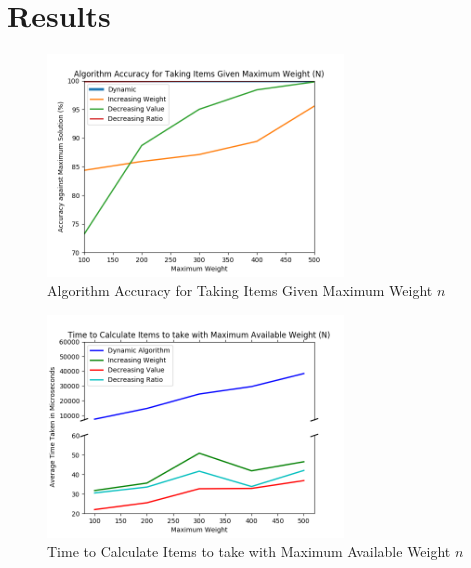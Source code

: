 \documentclass[10pt, letterpaper]{article}
\begin{document}
\section{Results}
\begin{figure}[htbp]
  \begin{center}
    \includegraphics[width=0.70\textwidth]{python/accuracyGraph.png}
    \caption{Algorithm Accuracy for Taking Items Given Maximum Weight $n$}
    \label{fig:accuracy-graph}
  \end{center}
\end{figure}
\begin{figure}[htbp]
  \begin{center}
    \includegraphics[width=0.70\textwidth]{python/timeGraph.png}
    \caption{Time to Calculate Items to take with Maximum Available Weight $n$}
    \label{fig:time-graph}
  \end{center}
\end{figure}
\end{document}

